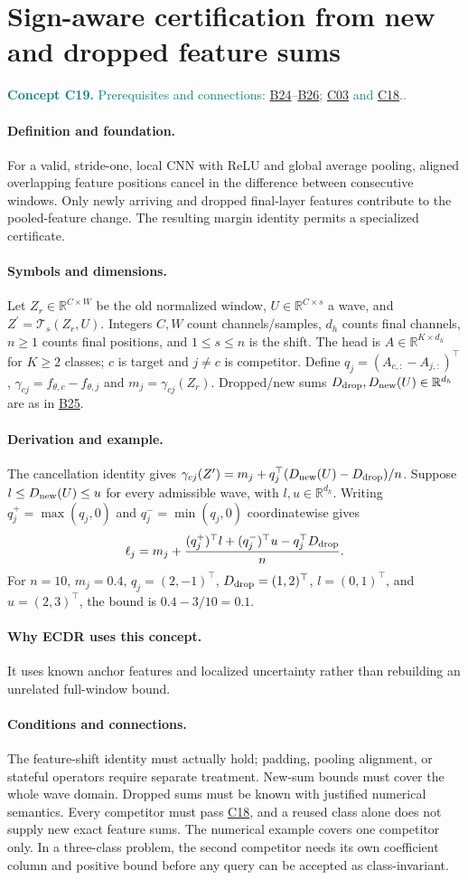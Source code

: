 \documentclass[11pt,a4paper]{article}
\newcommand{\R}{\mathbb R}
\newcommand{\conceptid}{Front matter}
\newcommand{\concept}[3]{\clearpage\renewcommand{\conceptid}{#1}%
\section{#2}\label{concept:#1}%
\textcolor{teal}{\textbf{Concept #1.} Prerequisites and connections: #3.}\par
\typeout{ECDR-CONCEPT-START #1 PAGE=\thepage}}
\begin{document}
\concept{C19}{Sign-aware certification from new and dropped feature sums}{\hyperref[concept:B24]{B24}--\hyperref[concept:B26]{B26}; \hyperref[concept:C03]{C03} and \hyperref[concept:C18]{C18}.}
\paragraph{Definition and foundation.}
For a valid, stride-one, local CNN with ReLU and global average pooling, aligned overlapping feature positions cancel in the difference between consecutive windows. Only newly arriving and dropped final-layer features contribute to the pooled-feature change. The resulting margin identity permits a specialized certificate.
\paragraph{Symbols and dimensions.}
Let $Z_r\in\R^{C\times W}$ be the old normalized window, $U\in\R^{C\times s}$ a wave, and $Z^\prime=\mathcal T_s(Z_r,U)$. Integers $C,W$ count channels/samples, $d_h$ counts final channels, $n\ge1$ counts final positions, and $1\le s\le n$ is the shift. The head is $A\in\R^{K\times d_h}$ for $K\ge2$ classes; $c$ is target and $j\ne c$ is competitor. Define $q_j=(A_{c,:}-A_{j,:})^\top$, $\gamma_{cj}=f_{\theta,c}-f_{\theta,j}$ and $m_j=\gamma_{cj}(Z_r)$. Dropped/new sums $D_{\rm drop},D_{\rm new}(U)\in\R^{d_h}$ are as in \hyperref[concept:B25]{B25}.
\paragraph{Derivation and example.}
The cancellation identity gives $\gamma_{cj}(Z^\prime)=m_j+q_j^\top(D_{\rm new}(U)-D_{\rm drop})/n$. Suppose $l\le D_{\rm new}(U)\le u$ for every admissible wave, with $l,u\in\R^{d_h}$. Writing $q_j^+=\max(q_j,0)$ and $q_j^-=\min(q_j,0)$ coordinatewise gives
\[
 \ell_j=m_j+\frac{(q_j^+)^\top l+(q_j^-)^\top u
                   -q_j^\top D_{\rm drop}}{n}.
\]
For $n=10$, $m_j=0.4$, $q_j=(2,-1)^\top$, $D_{\rm drop}=(1,2)^\top$, $l=(0,1)^\top$, and $u=(2,3)^\top$, the bound is $0.4-3/10=0.1$.
\paragraph{Why ECDR uses this concept.}
It uses known anchor features and localized uncertainty rather than rebuilding an unrelated full-window bound.
\paragraph{Conditions and connections.}
The feature-shift identity must actually hold; padding, pooling alignment, or stateful operators require separate treatment. New-sum bounds must cover the whole wave domain. Dropped sums must be known with justified numerical semantics. Every competitor must pass \hyperref[concept:C18]{C18}, and a reused class alone does not supply new exact feature sums. The numerical example covers one competitor only. In a three-class problem, the second competitor needs its own coefficient column and positive bound before any query can be accepted as class-invariant.
\par\label{endconcept:C19}
\end{document}
